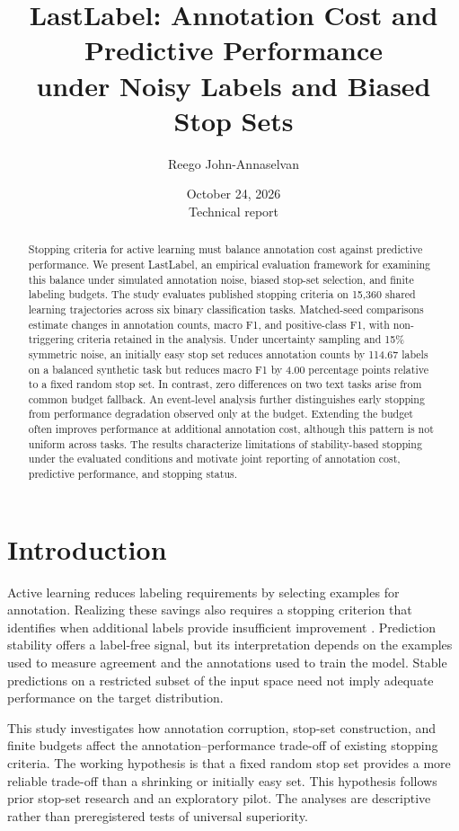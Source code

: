 \documentclass[10pt,twocolumn]{article}
\title{LastLabel: Annotation Cost and Predictive Performance\\under Noisy Labels and Biased Stop Sets}
\author{Reego John-Annaselvan}
\date{October 24, 2026\\\small Technical report}
\begin{document}
\maketitle
\begin{abstract}
Stopping criteria for active learning must balance annotation cost against predictive performance. We present LastLabel, an empirical evaluation framework for examining this balance under simulated annotation noise, biased stop-set selection, and finite labeling budgets. The study evaluates published stopping criteria on 15,360 shared learning trajectories across six binary classification tasks. Matched-seed comparisons estimate changes in annotation counts, macro F1, and positive-class F1, with non-triggering criteria retained in the analysis. Under uncertainty sampling and 15\% symmetric noise, an initially easy stop set reduces annotation counts by 114.67 labels on a balanced synthetic task but reduces macro F1 by 4.00 percentage points relative to a fixed random stop set. In contrast, zero differences on two text tasks arise from common budget fallback. An event-level analysis further distinguishes early stopping from performance degradation observed only at the budget. Extending the budget often improves performance at additional annotation cost, although this pattern is not uniform across tasks. The results characterize limitations of stability-based stopping under the evaluated conditions and motivate joint reporting of annotation cost, predictive performance, and stopping status.
\end{abstract}

\section{Introduction}
Active learning reduces labeling requirements by selecting examples for annotation. Realizing these savings also requires a stopping criterion that identifies when additional labels provide insufficient improvement \cite{sp}. Prediction stability offers a label-free signal, but its interpretation depends on the examples used to measure agreement and the annotations used to train the model. Stable predictions on a restricted subset of the input space need not imply adequate performance on the target distribution.

This study investigates how annotation corruption, stop-set construction, and finite budgets affect the annotation--performance trade-off of existing stopping criteria. The working hypothesis is that a fixed random stop set provides a more reliable trade-off than a shrinking or initially easy set. This hypothesis follows prior stop-set research \cite{stopsets} and an exploratory pilot. The analyses are descriptive rather than preregistered tests of universal superiority.
\end{document}
